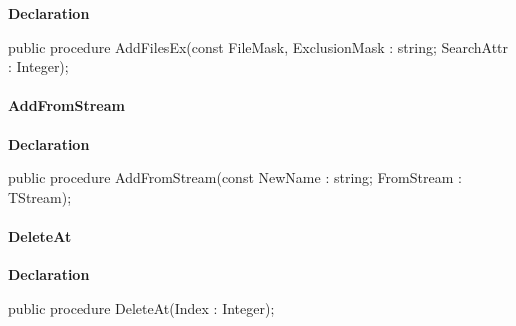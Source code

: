 \documentclass{report}
\newif\ifpdf
\begin{document}
\label{AbZipper.TAbCustomZipper-AddFilesEx}
\begin{list}{}{
\setlength{\itemindent}{0cm}
\setlength{\listparindent}{0cm}
\setlength{\leftmargin}{\evensidemargin}
\addtolength{\leftmargin}{\tmplength}
\settowidth{\labelsep}{X}
\addtolength{\leftmargin}{\labelsep}
\setlength{\labelwidth}{\tmplength}
}
\item[\textbf{Declaration}\hfill]
\ifpdf
\begin{flushleft}
\fi
\begin{ttfamily}
public procedure AddFilesEx(const FileMask, ExclusionMask : string; SearchAttr : Integer);\end{ttfamily}

\ifpdf
\end{flushleft}
\fi

\end{list}
\paragraph*{AddFromStream}\hspace*{\fill}

\label{AbZipper.TAbCustomZipper-AddFromStream}
\begin{list}{}{
\setlength{\itemindent}{0cm}
\setlength{\listparindent}{0cm}
\setlength{\leftmargin}{\evensidemargin}
\addtolength{\leftmargin}{\tmplength}
\settowidth{\labelsep}{X}
\addtolength{\leftmargin}{\labelsep}
\setlength{\labelwidth}{\tmplength}
}
\item[\textbf{Declaration}\hfill]
\ifpdf
\begin{flushleft}
\fi
\begin{ttfamily}
public procedure AddFromStream(const NewName : string; FromStream : TStream);\end{ttfamily}

\ifpdf
\end{flushleft}
\fi

\end{list}
\paragraph*{DeleteAt}\hspace*{\fill}

\label{AbZipper.TAbCustomZipper-DeleteAt}
\begin{list}{}{
\setlength{\itemindent}{0cm}
\setlength{\listparindent}{0cm}
\setlength{\leftmargin}{\evensidemargin}
\addtolength{\leftmargin}{\tmplength}
\settowidth{\labelsep}{X}
\addtolength{\leftmargin}{\labelsep}
\setlength{\labelwidth}{\tmplength}
}
\item[\textbf{Declaration}\hfill]
\ifpdf
\begin{flushleft}
\fi
\begin{ttfamily}
public procedure DeleteAt(Index : Integer);\end{ttfamily}

\ifpdf
\end{flushleft}
\fi

\end{list}
\end{document}
